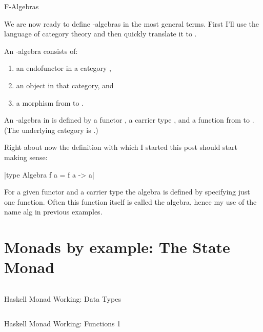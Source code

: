 \documentclass[proposal.tex]{subfiles}
\begin{document}
F-Algebras


We are now ready to define -algebras in the most general terms.
First I'll use the language of category theory and then quickly translate it to .

An -algebra consists of:
\begin{enumerate}
\item an endofunctor  in a category ,
\item an object  in that category, and
\item a morphism from  to .
\end{enumerate}

An -algebra in  is defined by a functor , a carrier type , and a function from  to . (The underlying category is .)

Right about now the definition with which I started this post should start making sense:

|type Algebra f a = f a -> a|

For a given functor  and a carrier type  the algebra is defined by specifying just one function.
Often this function itself is called the algebra, hence my use of the name alg in previous examples.


\section{Monads by example: The State Monad}


\begin{code-list}[H]
  \begin{singlespace}
    \inputminted[linenos, firstline=16, lastline=33]{haskell}{haskell-monad-working-2.hs}
  \end{singlespace}
  \caption{Haskell Monad Working: Data Types}
\label{tab:hskllmndworkngdatatype}
\end{code-list}

\begin{code-list}[H]
  \begin{singlespace}
    \inputminted[linenos, firstline=35, lastline=65]{haskell}{haskell-monad-working-2.hs}
  \end{singlespace}
  \caption{Haskell Monad Working: Functions 1}
\label{tab:hskllmndworkngfunctions1}
\end{code-list}
\end{document}

